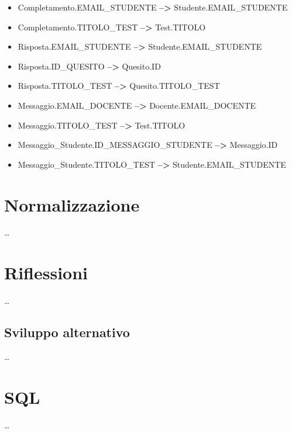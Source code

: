 \documentclass{article}
\begin{document}
\begin{itemize}[label={ }, leftmargin=*, wide=1pt]
    \item Completamento.EMAIL\_STUDENTE \textbf{-->} Studente.EMAIL\_STUDENTE
    \item Completamento.TITOLO\_TEST \textbf{-->} Test.TITOLO
    \item Risposta.EMAIL\_STUDENTE \textbf{-->} Studente.EMAIL\_STUDENTE
    \item Risposta.ID\_QUESITO \textbf{-->} Quesito.ID
    \item Risposta.TITOLO\_TEST \textbf{-->} Quesito.TITOLO\_TEST
    \item Messaggio.EMAIL\_DOCENTE \textbf{-->} Docente.EMAIL\_DOCENTE
    \item Messaggio.TITOLO\_TEST \textbf{-->} Test.TITOLO
    \item Messaggio\_Studente.ID\_MESSAGGIO\_STUDENTE \textbf{-->} Messaggio.ID
    \item Messaggio\_Studente.TITOLO\_TEST \textbf{-->} Studente.EMAIL\_STUDENTE
\end{itemize}


\newpage
\section{Normalizzazione}
\large
\dots

\section{Riflessioni}
\large
\dots

\subsection{Sviluppo alternativo}
\large
\dots

\section{SQL}
\large 
\dots
\end{document}
